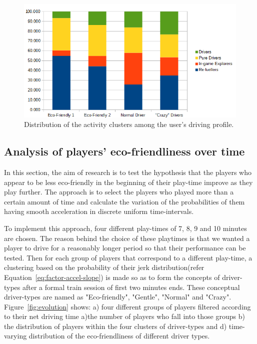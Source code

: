 \documentclass[preprint,authoryear,12pt]{elsarticle}
\begin{document}
\begin{figure}[htb]
	\begin{center}
		\includegraphics[width=.8\linewidth]{ijhcs14-img/cluster_activities_driver_types}
		\caption{Distribution of the activity clusters among the user's driving profile.\label{fig:activity_driving}}
	\end{center}
\end{figure}



\subsection{Analysis of players' eco-friendliness over time }
\label{subsec:eco-friendliness_over_time}

In this section, the aim of research is to test the hypothesis that the players who appear to be less eco-friendly in the beginning of their play-time improve as they play further. The approach is to select the players who played more than a certain amount of time and calculate the variation of the probabilities of them having smooth acceleration in discrete uniform time-intervals. 

To implement this approach, four different play-times of 7, 8, 9 and 10 minutes are chosen. The reason behind the choice of these playtimes is that we wanted a player to drive for a reasonably longer period so that their performance can be tested. Then for each group of players that correspond to a different play-time, a clustering based on the probability of their jerk distribution(refer Equation~\ref{eq:factor-accel-slope}) is made so as to form the concepts of driver-types after a formal train session of first two minutes ends. These conceptual driver-types are named as "Eco-friendly", "Gentle", "Normal" and "Crazy". Figure~\ref{fig:evolution} shows: a) four different groups of players filtered according to their net driving time  a)the number of players who fall into those groups b) the distribution of players within the four clusters of driver-types and d) time-varying distribution of the eco-friendliness of different driver types. 
\end{document}
